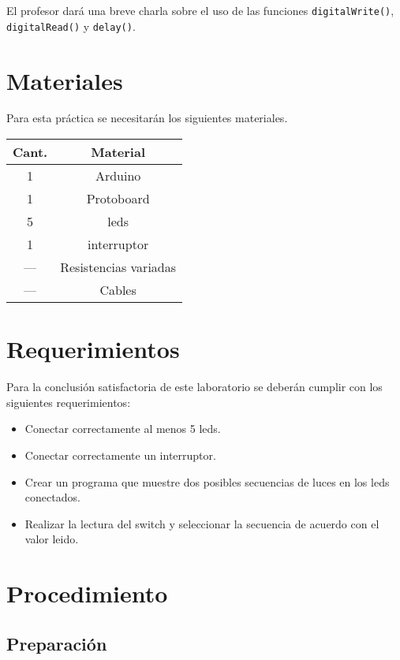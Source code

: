 \documentclass[12pt,letterpaper]{IEEEtran}
\begin{document}
El profesor dará una breve charla sobre el uso de las funciones \texttt{digitalWrite()}, \texttt{digitalRead()} y \texttt{delay()}.

\section{Materiales}

Para esta práctica se necesitarán los siguientes materiales.

\begin{center}
\begin{tabular}{c|c}\hline
	Cant. & \hspace{2cm}Material\hspace{2cm} \\\hline\hline
	1 	& Arduino 		\\\hline
	1	& Protoboard 	\\\hline	
	5	& leds			\\\hline
	1   & interruptor		\\\hline
	---	& Resistencias variadas \\\hline
	--- & Cables		\\\hline
\end{tabular}
\end{center}

\section{Requerimientos}

Para la conclusión satisfactoria de este laboratorio se deberán cumplir con los siguientes requerimientos:

\begin{itemize}
	\item Conectar correctamente al menos 5 leds.
	\item Conectar correctamente un interruptor.
    \item Crear un programa que muestre dos posibles secuencias de luces en los leds conectados.
    \item Realizar la lectura del switch y seleccionar la secuencia de acuerdo con el valor leido.
\end{itemize}

\section{Procedimiento}


\subsection{Preparación}
\end{document}
